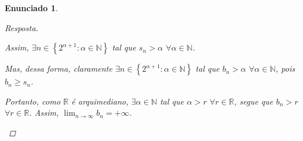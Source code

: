 \documentclass[a4paper,twoside,11pt]{article}
\newtheorem*{enunciado}{Enunciado}
\begin{document}
\begin{enunciado}
\begin{proof}[Resposta]
\begin{enumerate}[label=(\alph*)]
            Assim, $\exists n \in \left\{2^{\alpha+1} : \alpha \in \mathbb{N}\right\}$
            tal que $s_n > \alpha$ $\forall \alpha \in \mathbb{N}$.

            Mas, dessa forma, claramente $\exists n \in \left\{2^{\alpha+1} : \alpha \in \mathbb{N}\right\}$
            tal que $b_n > \alpha$ $\forall \alpha \in \mathbb{N}$, pois $b_n \geq s_n$.

            Portanto, como $\mathbb{R}$ é arquimediano, 
            $\exists \alpha \in \mathbb{N}$ tal que
            $\alpha > r$ $\forall r \in \mathbb{R}$, segue que
            $b_n > r$ $\forall r \in \mathbb{R}$. Assim,
            $\lim_{n \rightarrow \infty} b_n = +\infty$.
        \end{enumerate}
    \end{proof}
\end{enunciado}
\end{document}

